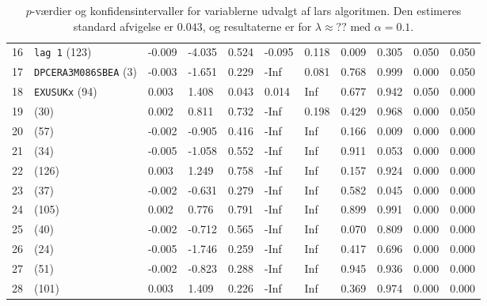 \begin{table}[h]
{\begin{tabular}{lllllllllll}
16 & \texttt{lag 1} (123) & -0.009 & -4.035  & 0.524  &  -0.095 &   0.118 &  0.009 &  0.305  &     0.050 &     0.050 \\
17 & \texttt{DPCERA3M086SBEA} (3) & -0.003 & -1.651  & 0.229  &    -Inf &   0.081 &  0.768 &  0.999  &     0.000  & 0.050 \\
18 & \texttt{EXUSUKx} (94) & 0.003 &  1.408 &  0.043  &   0.014 &     Inf &  0.677 &  0.942  &     0.050 &     0.000 \\
19 & (30) & 0.002  & 0.811  & 0.732  &    -Inf  &  0.198  & 0.429  & 0.968   &    0.000 &     0.050 \\
20 & (57) & -0.002 & -0.905 &  0.416 &     -Inf  &    Inf &  0.166  & 0.009  &     0.000  &    0.000 \\
21 & (34) & -0.005 & -1.058 &  0.552 &     -Inf    &  Inf &  0.911 &  0.053  &     0.000   &   0.000 \\
22 & (126) &  0.003  & 1.249  & 0.758  &    -Inf   &   Inf &  0.157 &  0.924  &     0.000  &    0.000 \\
23 & (37) & -0.002 & -0.631 &  0.279  &    -Inf  &    Inf &  0.582 &  0.045 &      0.000 &     0.000 \\
24 & (105) & 0.002  & 0.776  & 0.791   &   -Inf  &    Inf &  0.899  & 0.991   &    0.000  &    0.000\\
25 & (40) &-0.002 & -0.712 &  0.565 &     -Inf &     Inf  & 0.070 &  0.809   &    0.000   &   0.000 \\
26 & (24) & -0.005 & -1.746 &  0.259  &    -Inf &     Inf &  0.417  & 0.696   &    0.000 &     0.000 \\
27 & (51) & -0.002 & -0.823 &  0.288  &    -Inf  &    Inf &  0.945  & 0.936  &     0.000     & 0.000 \\
28 & (101) & 0.003 & 1.409 & 0.226  & -Inf & Inf & 0.369 & 0.974  & 0.000  &    0.000 \\
\bottomrule
\end{tabular}  
}
\caption{\(p\)-værdier og konfidensintervaller for variablerne udvalgt af lars algoritmen. Den estimeres standard afvigelse er \(0.043\), og resultaterne er for \(\lambda \approx ??\) med \(\alpha = 0.1\).} \label{fig:larInf}
\end{table} 
